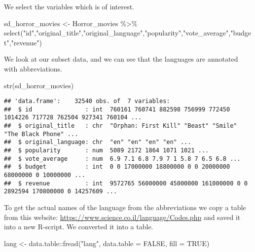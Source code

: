 \documentclass[
]{article}
\newenvironment{Shaded}{\begin{snugshade}}{\end{snugshade}}
\newcommand{\AttributeTok}[1]{\textcolor[rgb]{0.77,0.63,0.00}{#1}}
\newcommand{\ConstantTok}[1]{\textcolor[rgb]{0.00,0.00,0.00}{#1}}
\newcommand{\FunctionTok}[1]{\textcolor[rgb]{0.00,0.00,0.00}{#1}}
\newcommand{\NormalTok}[1]{#1}
\newcommand{\OtherTok}[1]{\textcolor[rgb]{0.56,0.35,0.01}{#1}}
\newcommand{\SpecialCharTok}[1]{\textcolor[rgb]{0.00,0.00,0.00}{#1}}
\newcommand{\StringTok}[1]{\textcolor[rgb]{0.31,0.60,0.02}{#1}}
\begin{document}
We select the variables which is of interest.

\begin{Shaded}
\begin{Highlighting}[]
\NormalTok{sd\_horror\_movies }\OtherTok{\textless{}{-}}\NormalTok{ Horror\_movies }\SpecialCharTok{\%\textgreater{}\%} \FunctionTok{select}\NormalTok{(}\StringTok{"id"}\NormalTok{,}\StringTok{"original\_title"}\NormalTok{,}\StringTok{"original\_language"}\NormalTok{,}\StringTok{"popularity"}\NormalTok{,}\StringTok{"vote\_average"}\NormalTok{,}\StringTok{"budget"}\NormalTok{,}\StringTok{"revenue"}\NormalTok{)}
\end{Highlighting}
\end{Shaded}

We look at our subset data, and we can see that the languages are
annotated with abbreviations.

\begin{Shaded}
\begin{Highlighting}[]
\FunctionTok{str}\NormalTok{(sd\_horror\_movies)}
\end{Highlighting}
\end{Shaded}

\begin{verbatim}
## 'data.frame':    32540 obs. of  7 variables:
##  $ id               : int  760161 760741 882598 756999 772450 1014226 717728 762504 927341 760104 ...
##  $ original_title   : chr  "Orphan: First Kill" "Beast" "Smile" "The Black Phone" ...
##  $ original_language: chr  "en" "en" "en" "en" ...
##  $ popularity       : num  5089 2172 1864 1071 1021 ...
##  $ vote_average     : num  6.9 7.1 6.8 7.9 7 1 5.8 7 6.5 6.8 ...
##  $ budget           : int  0 0 17000000 18800000 0 0 20000000 68000000 0 10000000 ...
##  $ revenue          : int  9572765 56000000 45000000 161000000 0 0 2892594 170800000 0 14257609 ...
\end{verbatim}

To get the actual names of the language from the abbreviations we copy a
table from this website:
\url{https://www.science.co.il/language/Codes.php} and saved it into a
new R-script. We converted it into a table.

\begin{Shaded}
\begin{Highlighting}[]
\NormalTok{lang }\OtherTok{\textless{}{-}}\NormalTok{ data.table}\SpecialCharTok{::}\FunctionTok{fread}\NormalTok{(}\StringTok{"lang"}\NormalTok{, }\AttributeTok{data.table =} \ConstantTok{FALSE}\NormalTok{, }\AttributeTok{fill =} \ConstantTok{TRUE}\NormalTok{)}
\end{Highlighting}
\end{Shaded}
\end{document}
